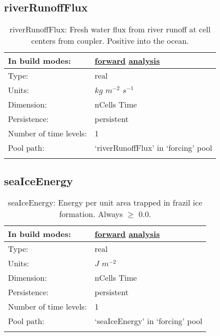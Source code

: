 \subsection[riverRunoffFlux]{riverRunoffFlux}
\label{subsec:var_sec_forcing_riverRunoffFlux}
\begin{center}
\begin{longtable}{| p{2.0in} | p{4.0in} |}
        \hline 
        In build modes: & \hyperref[subsec:forward_var_tab_forcing]{forward} \hyperref[subsec:analysis_var_tab_forcing]{analysis} \\
        \hline 
        Type: & real \\
        \hline 
        Units: & $kg$ $m^{-2}$ $s^{-1}$ \\
        \hline 
        Dimension: & nCells Time \\
        \hline 
        Persistence: & persistent \\
        \hline 
        Number of time levels: & 1 \\
        \hline 
            Pool path: & `riverRunoffFlux' in `forcing' pool \\
		 \hline 
    \caption{riverRunoffFlux: Fresh water flux from river runoff at cell centers from coupler. Positive into the ocean.}
\end{longtable}
\end{center}
\subsection[seaIceEnergy]{seaIceEnergy}
\label{subsec:var_sec_forcing_seaIceEnergy}
\begin{center}
\begin{longtable}{| p{2.0in} | p{4.0in} |}
        \hline 
        In build modes: & \hyperref[subsec:forward_var_tab_forcing]{forward} \hyperref[subsec:analysis_var_tab_forcing]{analysis} \\
        \hline 
        Type: & real \\
        \hline 
        Units: & $J$ $m^{-2}$ \\
        \hline 
        Dimension: & nCells Time \\
        \hline 
        Persistence: & persistent \\
        \hline 
        Number of time levels: & 1 \\
        \hline 
            Pool path: & `seaIceEnergy' in `forcing' pool \\
		 \hline 
    \caption{seaIceEnergy:  Energy per unit area trapped in frazil ice formation. Always  $\ge$  0.0.}
\end{longtable}
\end{center}
